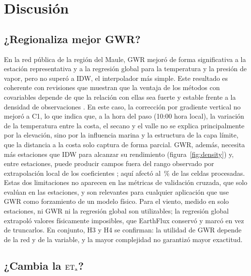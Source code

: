 \section{Discusión}\label{sec:discussion}

\subsection{¿Regionaliza mejor GWR?}

En la red pública de la región del Maule, GWR mejoró de forma significativa
a la estación representativa y a la regresión global para la temperatura y
la presión de vapor, pero no superó a IDW, el interpolador más simple. Este
resultado es coherente con revisiones que muestran que la ventaja de los
métodos con covariables depende de que la relación con ellas sea fuerte y
estable frente a la densidad de observaciones \parencite{li2014interpolation}.
En este caso, la corrección por gradiente vertical no mejoró a C1, lo que
indica que, a la hora del paso (10:00 hora local), la variación de la
temperatura entre la costa, el secano y el valle no se explica
principalmente por la elevación, sino por la influencia marina y la
estructura de la capa límite, que la distancia a la costa solo captura de
forma parcial. GWR, además, necesita más estaciones que IDW para alcanzar su
rendimiento (figura~\ref{fig:density}) y, entre estaciones, puede producir
campos fuera del rango observado por extrapolación local de los
coeficientes \parencite{wheeler2005multicollinearity}; aquí afectó al
\RangeTaCThreeGWRAbove\,\% de las celdas procesadas. Estas dos limitaciones
no aparecen en las métricas de validación cruzada, que solo evalúan en las
estaciones, y son relevantes para cualquier aplicación que use GWR como
forzamiento de un modelo físico. Para el viento, medido en solo
\NStationsWind{} estaciones, ni GWR ni la regresión global son utilizables;
la regresión global extrapoló valores físicamente imposibles, que
EarthFlux conservó y marcó en vez de truncarlos. En conjunto, H3 y H4 se
confirman: la utilidad de GWR depende de la red y de la variable, y la mayor
complejidad no garantizó mayor exactitud.

\subsection{¿Cambia la $\mathrm{ET_a}$?}

